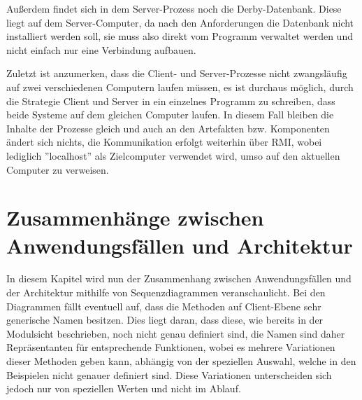 \documentclass[fontsize=12pt,paper=a4,twoside]{scrartcl}
\begin{document}
Außerdem findet sich in dem Server-Prozess noch die Derby-Datenbank. Diese liegt auf dem Server-Computer, da nach den Anforderungen die Datenbank nicht installiert werden soll, sie muss also direkt vom Programm verwaltet werden und nicht einfach nur eine Verbindung aufbauen.

Zuletzt ist anzumerken, dass die Client- und Server-Prozesse nicht zwangsläufig auf zwei verschiedenen Computern laufen müssen, es ist durchaus möglich, durch die Strategie Client und Server in ein einzelnes Programm zu schreiben, dass beide Systeme auf dem gleichen Computer laufen. In diesem Fall bleiben die Inhalte der Prozesse gleich und auch an den Artefakten bzw. Komponenten ändert sich nichts, die Kommunikation erfolgt weiterhin über RMI, wobei lediglich ''localhost'' als Zielcomputer verwendet wird, umso auf den aktuellen Computer zu verweisen.


\section[Zusammenhänge zwischen Anwendungsfällen und Architektur]{Zusammenhänge zwischen Anwendungsfällen und Architektur}
\label{sec:anwendungsfaelle}

In diesem Kapitel wird nun der Zusammenhang zwischen Anwendungsfällen und der Architektur mithilfe von Sequenzdiagrammen veranschaulicht. Bei den Diagrammen fällt eventuell auf, dass die Methoden auf Client-Ebene sehr generische Namen besitzen. Dies liegt daran, dass diese, wie bereits in der Modulsicht beschrieben, noch nicht genau definiert sind, die Namen sind daher Repräsentanten für entsprechende Funktionen, wobei es mehrere Variationen dieser Methoden geben kann, abhängig von der speziellen Auswahl, welche in den Beispielen nicht genauer definiert sind. Diese Variationen unterscheiden sich jedoch nur von speziellen Werten und nicht im Ablauf.
\end{document}
